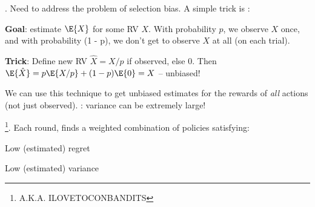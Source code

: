 \documentclass[11pt]{article}
\begin{document}
. Need to address the problem of selection bias. A simple trick is :

\begin{definition}
	\textbf{Goal}: estimate $\E{X}$ for some RV $X$. With probability $p$, we observe $X$ once, and with probability (1 - p), we don't get to observe $X$ at all (on each trial). 
	
	\textbf{Trick}: Define new RV $\hat{X} = X / p$ if observed, else 0. Then $\E{\hat X} = p \E{X / p} + (1 - p) \E{0} = X$ -- unbiased!
\end{definition}
We can use this technique to get unbiased estimates for the rewards of \textit{all} actions (not just observed). : variance can be extremely large!



\footnote{A.K.A. ILOVETOCONBANDITS}. Each round, finds a weighted combination of policies satisfying:
\begin{compactenum}
	\item Low (estimated) regret
	\item Low (estimated) variance
\end{compactenum}

















\end{document}
